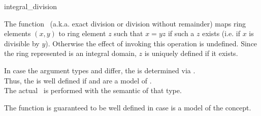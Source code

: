 \begin{ccRefFunction}{integral_division}

\ccDefinition

The function \ccRefName\ (a.k.a. exact division or division without remainder) 
maps ring elements $(x,y)$ to ring element $z$ such that $x = yz$ if such a $z$ 
exists (i.e. if $x$ is divisible by $y$). Otherwise the effect of invoking 
this operation is undefined. Since the ring represented is an integral domain, 
$z$ is uniquely defined if it exists. 

In case the argument types  and  differ, 
the  is determined via .\\
Thus, the  is well defined if  and  
are a model of . \\
The actual \ccRefName\ is performed with the semantic of that type.

The function is guaranteed to be well defined in case 
is a model of the  concept.



\ccSeeAlso

\\
\\

\end{ccRefFunction}

